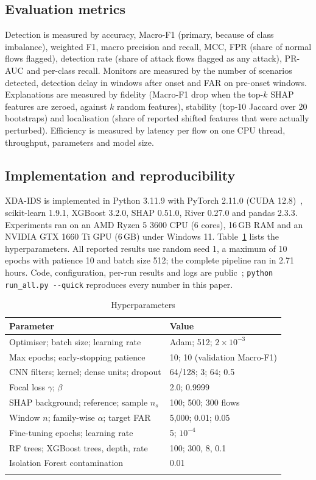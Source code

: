 \documentclass[pdflatex,sn-mathphys-num]{sn-jnl}%
\begin{document}
\subsection{Evaluation metrics}
Detection is measured by accuracy, Macro-F1 (primary, because of class imbalance), weighted F1, macro precision and recall, MCC, FPR (share of normal flows flagged), detection rate (share of attack flows flagged as any attack), PR-AUC and per-class recall. Monitors are measured by the number of scenarios detected, detection delay in windows after onset and FAR on pre-onset windows. Explanations are measured by fidelity (Macro-F1 drop when the top-$k$ SHAP features are zeroed, against $k$ random features), stability (top-10 Jaccard over 20 bootstraps) and localisation (share of reported shifted features that were actually perturbed). Efficiency is measured by latency per flow on one CPU thread, throughput, parameters and model size.

\subsection{Implementation and reproducibility}
XDA-IDS is implemented in Python 3.11.9 with PyTorch 2.11.0 (CUDA 12.8)~\cite{paszke2019}, scikit-learn 1.9.1, XGBoost 3.2.0, SHAP 0.51.0, River 0.27.0 and pandas 2.3.3. Experiments ran on an AMD Ryzen 5 3600 CPU (6 cores), 16\,GB RAM and an NVIDIA GTX 1660 Ti GPU (6\,GB) under Windows 11. Table~\ref{tab:hyper} lists the hyperparameters. All reported results use random seed 1, a maximum of 10 epochs with patience 10 and batch size 512; the complete pipeline ran in 2.71 hours. Code, configuration, per-run results and logs are public~\cite{repo}; \texttt{python run\_all.py -{}-quick} reproduces every number in this paper.

\begin{table}[!htbp]
\caption{Hyperparameters}\label{tab:hyper}%
\begin{tabular}{@{}ll@{}}
\toprule
Parameter & Value \\
\midrule
Optimiser; batch size; learning rate & Adam; 512; $2\times10^{-3}$ \\
Max epochs; early-stopping patience & 10; 10 (validation Macro-F1) \\
CNN filters; kernel; dense units; dropout & 64/128; 3; 64; 0.5 \\
Focal loss $\gamma$; $\beta$ & 2.0; 0.9999 \\
SHAP background; reference; sample $n_s$ & 100; 500; 300 flows \\
Window $n$; family-wise $\alpha$; target FAR & 5{,}000; 0.01; 0.05 \\
Fine-tuning epochs; learning rate & 5; $10^{-4}$ \\
RF trees; XGBoost trees, depth, rate & 100; 300, 8, 0.1 \\
Isolation Forest contamination & 0.01 \\
\botrule
\end{tabular}
\end{table}
\end{document}
